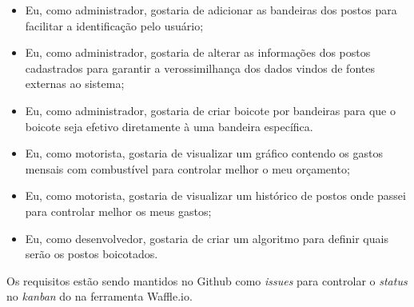 \begin{itemize}
    \item Eu, como administrador, gostaria de adicionar as bandeiras dos postos para facilitar a identificação pelo usuário;
    \item Eu, como administrador, gostaria de alterar as informações dos postos cadastrados para garantir a verossimilhança dos dados vindos de fontes externas ao sistema;
    \item Eu, como administrador, gostaria de criar boicote por bandeiras para que o boicote seja efetivo diretamente à uma bandeira específica.
    \item Eu, como motorista, gostaria de visualizar um gráfico contendo os gastos mensais com combustível para controlar melhor o meu orçamento;
    \item Eu, como motorista, gostaria de visualizar um histórico de postos onde passei para controlar melhor os meus gastos;
    \item Eu, como desenvolvedor, gostaria de criar um algoritmo para definir quais serão os postos boicotados.
\end{itemize}
Os requisitos estão sendo mantidos no Github como \textit{issues} para controlar o \textit{status} no \textit{kanban} do  na ferramenta Waffle.io.
